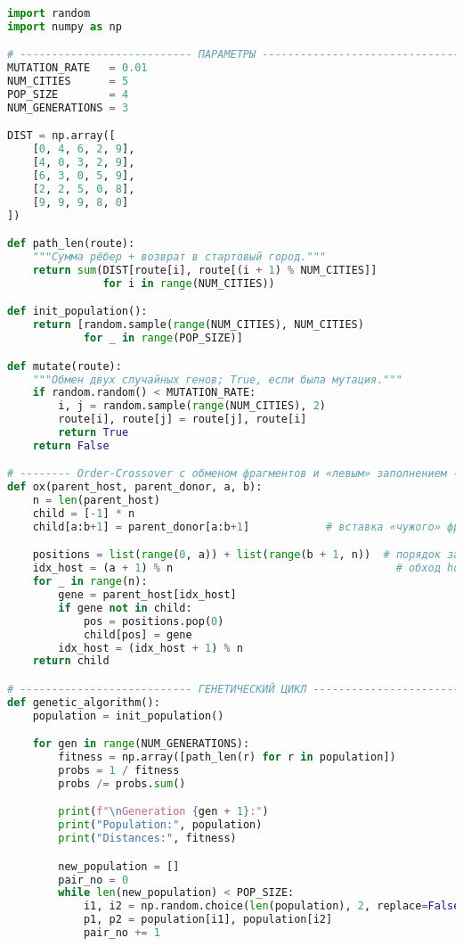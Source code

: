 \documentclass[a4paper,12pt]{article}
\begin{document}
\begin{lstlisting}[language=Python]
import random
import numpy as np

# --------------------------- ПАРАМЕТРЫ ---------------------------------------
MUTATION_RATE   = 0.01
NUM_CITIES      = 5
POP_SIZE        = 4
NUM_GENERATIONS = 3

DIST = np.array([
    [0, 4, 6, 2, 9],
    [4, 0, 3, 2, 9],
    [6, 3, 0, 5, 9],
    [2, 2, 5, 0, 8],
    [9, 9, 9, 8, 0]
])

def path_len(route):
    """Сумма рёбер + возврат в стартовый город."""
    return sum(DIST[route[i], route[(i + 1) % NUM_CITIES]]
               for i in range(NUM_CITIES))

def init_population():
    return [random.sample(range(NUM_CITIES), NUM_CITIES)
            for _ in range(POP_SIZE)]

def mutate(route):
    """Обмен двух случайных генов; True, если была мутация."""
    if random.random() < MUTATION_RATE:
        i, j = random.sample(range(NUM_CITIES), 2)
        route[i], route[j] = route[j], route[i]
        return True
    return False

# -------- Order‑Crossover с обменом фрагментов и «левым» заполнением ----------
def ox(parent_host, parent_donor, a, b):
    n = len(parent_host)
    child = [-1] * n
    child[a:b+1] = parent_donor[a:b+1]            # вставка «чужого» фрагмента

    positions = list(range(0, a)) + list(range(b + 1, n))  # порядок заполнения
    idx_host = (a + 1) % n                                   # обход host
    for _ in range(n):
        gene = parent_host[idx_host]
        if gene not in child:
            pos = positions.pop(0)
            child[pos] = gene
        idx_host = (idx_host + 1) % n
    return child

# --------------------------- ГЕНЕТИЧЕСКИЙ ЦИКЛ --------------------------------
def genetic_algorithm():
    population = init_population()

    for gen in range(NUM_GENERATIONS):
        fitness = np.array([path_len(r) for r in population])
        probs = 1 / fitness
        probs /= probs.sum()

        print(f"\nGeneration {gen + 1}:")
        print("Population:", population)
        print("Distances:", fitness)

        new_population = []
        pair_no = 0
        while len(new_population) < POP_SIZE:
            i1, i2 = np.random.choice(len(population), 2, replace=False, p=probs)
            p1, p2 = population[i1], population[i2]
            pair_no += 1


\end{lstlisting}
\end{document}
